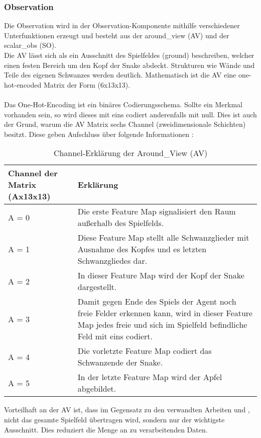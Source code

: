 \subsubsection{Observation} \label{subsubsec:Konzept_Observation}
Die Observation wird in der Observation-Komponente mithilfe verschiedener Unterfunktionen erzeugt und besteht aus der around\_view (AV) und der scalar\_obs (SO).\\
Die AV lässt sich als ein Ausschnitt des Spielfeldes (ground) beschreiben, welcher einen festen Bereich um den Kopf der Snake abdeckt.
Strukturen wie Wände und Teile des eigenen Schwanzes werden deutlich. Mathematisch ist die AV eine one-hot-encoded Matrix der Form (6x13x13).\\
\\Das One-Hot-Encoding ist ein binäres Codierungsschema. Sollte ein Merkmal vorhanden sein, so wird dieses mit eins codiert anderenfalls mit null. \cite[S. 359 f.]{DRL_Lapan}
Dies ist auch der Grund, warum die AV Matrix sechs Channel (zweidimensionale Schichten) besitzt. Diese geben Aufschluss über folgende Informationen :
\begin{longtable}[h]{|p{4cm}|p{\linewidth - 5cm}|}
	\caption{Channel-Erklärung der Around\_View (AV)}
	\label{tab:Konzept_around_view} 
	\endfirsthead
	\endhead
	\hline
	Channel der Matrix (Ax13x13) & Erklärung \\
	\hline
	A = 0 & Die erste Feature Map signalisiert den Raum außerhalb des Spielfelds.\\
	\hline
	A = 1 & Diese Feature Map stellt alle Schwanzglieder mit Ausnahme des Kopfes und es letzten Schwanzgliedes dar. \\
	\hline
	A = 2 & In dieser Feature Map wird der Kopf der Snake dargestellt. \\
	\hline
	A = 3 & Damit gegen Ende des Spiels der Agent noch freie Felder erkennen kann, wird in dieser Feature Map jedes freie und sich im Spielfeld befindliche Feld mit eins codiert. \\
	\hline
	A = 4 & Die vorletzte Feature Map codiert das Schwanzende der Snake. \\
	\hline
	A = 5 & In der letzte Feature Map wird der Apfel abgebildet. \\
	\hline
\end{longtable}
Vorteilhaft an der AV ist, dass im Gegensatz zu den verwandten Arbeiten \cite{Autonomous_Agents_in_Snake_Game_via_DRL} und \cite{UAV}, nicht das gesamte Spielfeld übertragen wird, sondern nur der wichtigste Ausschnitt. Dies reduziert die Menge an zu verarbeitenden Daten.
